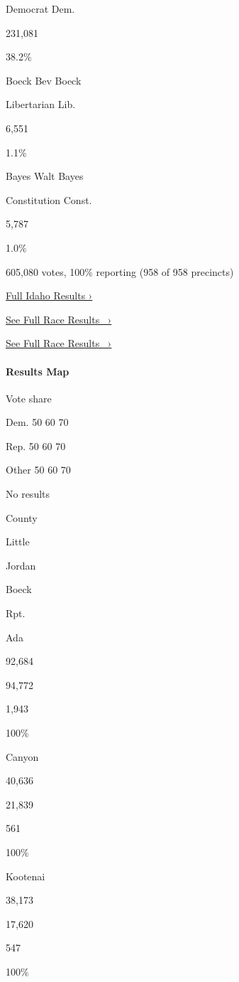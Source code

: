 Democrat Dem.

231,081

38.2\%

 Boeck Bev Boeck

Libertarian Lib.

6,551

1.1\%

 Bayes Walt Bayes

Constitution Const.

5,787

1.0\%

605,080 votes, 100\% reporting (958 of 958 precincts)

\href{https://www.nytimes3xbfgragh.onion/interactive/2018/11/06/us/elections/results-idaho-elections.html}{Full
Idaho Results ›}

\href{https://www.nytimes3xbfgragh.onion/elections/results/idaho-governor}{See
Full Race Results~ ›}

\href{https://www.nytimes3xbfgragh.onion/elections/results/idaho-governor}{See
Full Race Results~ ›}

\hypertarget{results-map}{%
\paragraph{Results Map}\label{results-map}}

Vote share

Dem. 50 60 70

Rep. 50 60 70

Other 50 60 70

No results

County

Little

Jordan

Boeck

Rpt.

Ada

92,684

94,772

1,943

100\%

Canyon

40,636

21,839

561

100\%

Kootenai

38,173

17,620

547

100\%

